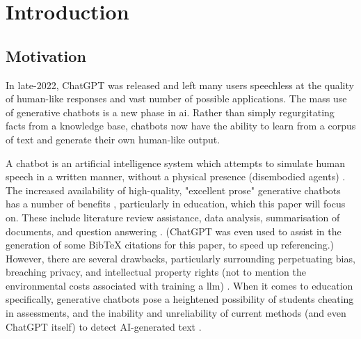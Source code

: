\chapter{Introduction}



\section{Motivation} %
\label{sec:intro_motivation}

In late-2022, ChatGPT was released and left many users speechless at the quality of human-like responses and vast number of possible applications. The mass use of generative chatbots is a new phase in \acrfull{ai}. Rather than simply regurgitating facts from a knowledge base, chatbots now have the ability to learn from a corpus of text and generate their own human-like output.

A chatbot is an artificial intelligence system which attempts to simulate human speech in a written manner, without a physical presence (disembodied agents) \citep{Nee2023ExploringTT}. The increased availability of high-quality, "excellent prose" generative chatbots has a number of benefits \citep{Floridi}, particularly in education, which this paper will focus on. These include literature review assistance, data analysis, summarisation of documents, and question answering \citep{lund2023chatting}. (ChatGPT was even used to assist in the generation of some BibTeX citations for this paper, to speed up referencing.) However, there are several drawbacks, particularly surrounding perpetuating bias, breaching privacy, and intellectual property rights (not to mention the environmental costs associated with training a \acrfull{llm}) \citep{Jungherr, Bender21}. When it comes to education specifically, generative chatbots pose a heightened possibility of students cheating in assessments, and the inability and unreliability of current methods (and even ChatGPT itself) to detect AI-generated text \citep{susnjak2022, Cotton}.

